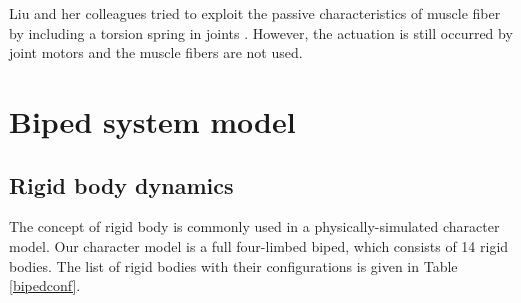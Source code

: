 \documentclass[master,english,final]{kaist-ucs}
\begin{document}
Liu and her colleagues tried to exploit the passive characteristics of
muscle fiber by including a torsion spring in joints \cite{Liu:2005:LPB}.
However, the actuation
is still occurred by joint motors and the muscle fibers are not used.




\chapter{Biped system model}

\section{Rigid body dynamics}

The concept of rigid body is commonly used in a physically-simulated
character model.
Our character model is a full four-limbed biped, which consists of 14 rigid bodies.
The list of rigid bodies with their configurations is given in Table \ref{bipedconf}.
\end{document}
